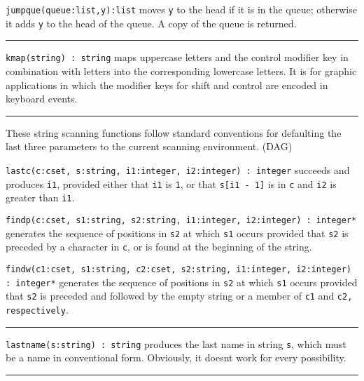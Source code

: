 \texttt{jumpque(}\texttt{queue}\texttt{:list,y):list} moves
\texttt{y} to the head if it is in the queue; otherwise it adds
\texttt{y} to the head of the queue. A copy of the queue is returned.


\vspace{0.25cm}\hrule{}

\texttt{kmap(string) : string} maps uppercase letters and the control
modifier key in combination with letters into the corresponding
lowercase letters. It is for graphic applications in which the modifier
keys for shift and control are encoded in keyboard
events. 

\vspace{0.25cm}\hrule{}

These string scanning functions follow standard conventions for
defaulting the last three parameters to the current scanning
environment. (DAG)

\texttt{lastc(c:cset, s:string, i1:integer, i2:integer) : integer}
succeeds and produces \texttt{i1}, provided either that \texttt{i1} is
\texttt{1}, or that \texttt{s[i1 - 1]} is in \texttt{c} and \texttt{i2}
is greater than \texttt{i1}.

\texttt{findp(c:cset, s1:string, s2:string, i1:integer, i2:integer) :
integer*} generates the sequence of positions in \texttt{s2} at which
\texttt{s1} occurs provided that \texttt{s2} is preceded by a character
in \texttt{c}, or is found at the beginning of the string.

\texttt{findw(c1:cset, s1:string, c2:cset, s2:string, i1:integer,
i2:integer) : integer*} generates the sequence of positions in
\texttt{s2} at which \texttt{s1} occurs provided that \texttt{s2} is
preceded and followed by the empty string or a member of \texttt{c1}
and \texttt{c2, respectively}.

\vspace{0.25cm}\hrule{}

\texttt{lastname(s:string) : string} produces the last name in string
\texttt{s}, which must be a name in conventional form. Obviously, it
doesn{\textquotesingle}t work for every possibility. 

\vspace{0.25cm}\hrule{}


